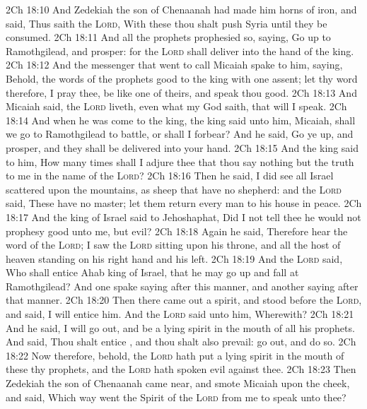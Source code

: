 \vs 2Ch 18:10 And Zedekiah the son of Chenaanah had made him horns of iron, and said, Thus saith the \textsc{Lord}, With these thou shalt push Syria until they be consumed.
\vs 2Ch 18:11 And all the prophets prophesied so, saying, Go up to Ramothgilead, and prosper: for the \textsc{Lord} shall deliver  into the hand of the king.
\vs 2Ch 18:12 And the messenger that went to call Micaiah spake to him, saying, Behold, the words of the prophets  good to the king with one assent; let thy word therefore, I pray thee, be like one of theirs, and speak thou good.
\vs 2Ch 18:13 And Micaiah said,  the \textsc{Lord} liveth, even what my God saith, that will I speak.
\vs 2Ch 18:14 And when he was come to the king, the king said unto him, Micaiah, shall we go to Ramothgilead to battle, or shall I forbear? And he said, Go ye up, and prosper, and they shall be delivered into your hand.
\vs 2Ch 18:15 And the king said to him, How many times shall I adjure thee that thou say nothing but the truth to me in the name of the \textsc{Lord}?
\vs 2Ch 18:16 Then he said, I did see all Israel scattered upon the mountains, as sheep that have no shepherd: and the \textsc{Lord} said, These have no master; let them return  every man to his house in peace.
\vs 2Ch 18:17 And the king of Israel said to Jehoshaphat, Did I not tell thee  he would not prophesy good unto me, but evil?
\vs 2Ch 18:18 Again he said, Therefore hear the word of the \textsc{Lord}; I saw the \textsc{Lord} sitting upon his throne, and all the host of heaven standing on his right hand and  his left.
\vs 2Ch 18:19 And the \textsc{Lord} said, Who shall entice Ahab king of Israel, that he may go up and fall at Ramothgilead? And one spake saying after this manner, and another saying after that manner.
\vs 2Ch 18:20 Then there came out a spirit, and stood before the \textsc{Lord}, and said, I will entice him. And the \textsc{Lord} said unto him, Wherewith?
\vs 2Ch 18:21 And he said, I will go out, and be a lying spirit in the mouth of all his prophets. And  said, Thou shalt entice , and thou shalt also prevail: go out, and do  so.
\vs 2Ch 18:22 Now therefore, behold, the \textsc{Lord} hath put a lying spirit in the mouth of these thy prophets, and the \textsc{Lord} hath spoken evil against thee.
\vs 2Ch 18:23 Then Zedekiah the son of Chenaanah came near, and smote Micaiah upon the cheek, and said, Which way went the Spirit of the \textsc{Lord} from me to speak unto thee?
